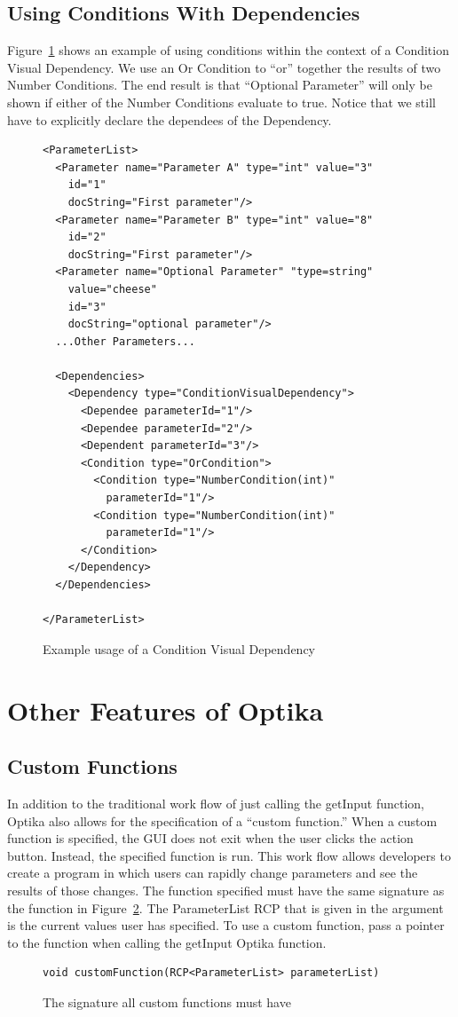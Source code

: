 \subsection{Using Conditions With Dependencies}
Figure~\ref{conVisDep} shows an example of using conditions within the context of a Condition Visual Dependency.
We use an Or Condition to ``or'' together the results of two Number Conditions. The end result is that ``Optional Parameter'' 
will only be shown if either of the Number Conditions evaluate to true. Notice that we still have to explicitly declare
the dependees of the Dependency.
\begin{figure}
\centering
{\footnotesize
\begin{Verbatim}
<ParameterList>
  <Parameter name="Parameter A" type="int" value="3"
    id="1"
    docString="First parameter"/>
  <Parameter name="Parameter B" type="int" value="8"
    id="2"
    docString="First parameter"/>
  <Parameter name="Optional Parameter" "type=string"
    value="cheese"
    id="3"
    docString="optional parameter"/>
  ...Other Parameters...

  <Dependencies>
    <Dependency type="ConditionVisualDependency">
      <Dependee parameterId="1"/>
      <Dependee parameterId="2"/>
      <Dependent parameterId="3"/>
      <Condition type="OrCondition">
        <Condition type="NumberCondition(int)" 
          parameterId="1"/>
        <Condition type="NumberCondition(int)"
          parameterId="1"/>
      </Condition>
    </Dependency>
  </Dependencies>

</ParameterList>
\end{Verbatim}
}
\caption{Example usage of a Condition Visual Dependency}
\label{conVisDep}
\end{figure}

\section{Other Features of Optika}
\subsection{Custom Functions}
In addition to the traditional work flow of just calling the getInput function, Optika also allows for the specification of a ``custom function.''
When a custom function is specified, the GUI does not exit when the user clicks the action button. Instead, the specified function is run. This work flow allows developers 
to create a program in which users can rapidly change parameters and see the results of those changes. The function specified must have the same signature as the function 
in Figure~\ref{custSig}. The ParameterList RCP that is given in the argument is the current values user has specified. To use a custom function, pass a pointer to the
function when calling the getInput Optika function.
\begin{figure}
\centering
{\footnotesize
\begin{Verbatim}
void customFunction(RCP<ParameterList> parameterList)
\end{Verbatim}
}
\caption{The signature all custom functions must have}
\label{custSig}
\end{figure}

